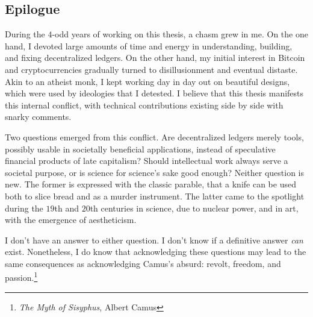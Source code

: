 \subsection*{Epilogue}

During the $4$-odd years of working on this thesis, a chasm grew in me. On
the one hand, I devoted large amounts of time and energy in understanding,
building, and fixing decentralized ledgers. On the other hand, my
initial interest in Bitcoin and cryptocurrencies gradually turned to
disillusionment and eventual distaste. Akin to an atheist monk, I kept working
day in day out on beautiful designs, which were used by ideologies that I
detested. I believe that this thesis manifests this internal conflict, with
technical contributions existing side by side with snarky comments.

Two questions emerged from this conflict. Are decentralized ledgers
merely tools, possibly usable in societally beneficial applications,
instead of speculative financial products of late capitalism? Should
intellectual work always serve a societal purpose, or is science for science's
sake good enough? Neither question is new. The former is expressed with the
classic parable, that a knife can be used both to slice bread and as a murder
instrument. The latter came to the spotlight during the $19$th and $20$th
centuries in science, due to nuclear power, and in art, with the emergence of
aestheticism.

I don't have an answer to either question. I don't know if a definitive answer
\emph{can} exist. Nonetheless, I do know that acknowledging these questions may
lead to the same consequences as acknowledging Camus's absurd: revolt, freedom,
and passion.\footnote{\emph{The Myth of Sisyphus}, Albert Camus}
